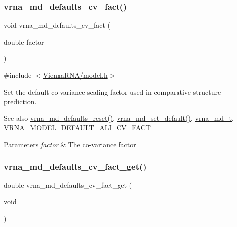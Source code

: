 \subsubsection{\texorpdfstring{vrna\_md\_defaults\_cv\_fact()}{vrna\_md\_defaults\_cv\_fact()}}
{\footnotesize\ttfamily void vrna\+\_\+md\+\_\+defaults\+\_\+cv\+\_\+fact (\begin{DoxyParamCaption}\item[{double}]{factor }\end{DoxyParamCaption})}



{\ttfamily \#include $<$\mbox{\hyperlink{model_8h}{Vienna\+R\+N\+A/model.\+h}}$>$}



Set the default co-\/variance scaling factor used in comparative structure prediction. 

\begin{DoxySeeAlso}{See also}
\mbox{\hyperlink{group__model__details_ga70834424cf804d149937de89f80ceb45}{vrna\+\_\+md\+\_\+defaults\+\_\+reset()}}, \mbox{\hyperlink{group__model__details_ga8ac6ff84936282436f822644bf841f66}{vrna\+\_\+md\+\_\+set\+\_\+default()}}, \mbox{\hyperlink{group__model__details_ga1f8a10e12a0a1915f2a4eff0b28ea17c}{vrna\+\_\+md\+\_\+t}}, \mbox{\hyperlink{group__model__details_gaaaf3d73d6abc18d3889676952bfedb96}{V\+R\+N\+A\+\_\+\+M\+O\+D\+E\+L\+\_\+\+D\+E\+F\+A\+U\+L\+T\+\_\+\+A\+L\+I\+\_\+\+C\+V\+\_\+\+F\+A\+CT}} 
\end{DoxySeeAlso}

\begin{DoxyParams}{Parameters}
{\em factor} & The co-\/variance factor \\
\hline
\end{DoxyParams}
\mbox{\label{group__model__details_gae59c68393807217b0a2497adb64d3ee3}} 
\subsubsection{\texorpdfstring{vrna\_md\_defaults\_cv\_fact\_get()}{vrna\_md\_defaults\_cv\_fact\_get()}}
{\footnotesize\ttfamily double vrna\+\_\+md\+\_\+defaults\+\_\+cv\+\_\+fact\+\_\+get (\begin{DoxyParamCaption}\item[{void}]{ }\end{DoxyParamCaption})}



